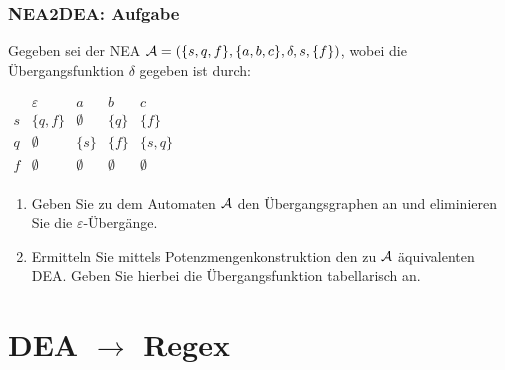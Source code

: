 \begin{frame}
	\frametitle{NEA2DEA: Aufgabe}
Gegeben sei der NEA ${\cal A}=(\{s,q,f\},\{a,b,c\},\delta,s,\{f\})$, wobei
die Übergangsfunktion $\delta$ gegeben ist durch:
\begin{center}
$\begin{array}{r|cccc}
&\varepsilon & a & b & c\\\hline
s & \{q,f\} & \emptyset & \{q\} &\{f\}\\
q &  \emptyset & \{s\} & \{f\} & \{s,q\}\\
f & \emptyset & \emptyset &  \emptyset &  \emptyset\\
\end{array}$
\end{center}
\begin{enumerate}
\item Geben Sie zu dem Automaten ${\cal A}$ den Übergangsgraphen an und eliminieren
Sie die $\varepsilon$-Übergänge.
\item Ermitteln Sie mittels Potenzmengenkonstruktion den zu ${\cal A}$ äquivalenten
DEA. Geben Sie hierbei die Übergangsfunktion tabellarisch an.
\end{enumerate}
\end{frame}
%

\section{DEA $\rightarrow$ Regex}
